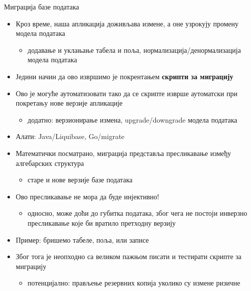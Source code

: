 \documentclass[aspectratio=169]{beamer}
\begin{document}
    \begin{frame}[allowframebreaks]{Миграција базе података}
        \begin{itemize}
            \item Кроз време, наша апликација доживљава измене, а оне узрокују промену модела података
            \begin{itemize}
                \item додавање и уклањање табела и поља, нормализација/денормализација модела података
            \end{itemize}
            \item Једини начин да ово извршимо је покрентањем \textbf{скрипти за миграцију}
            \item Ово је могуће аутоматизовати тако да се скрипте изврше аутоматски при покретању нове верзије апликације
            \begin{itemize}
                \item додатно: верзионирање измена, upgrade/downgrade модела података
            \end{itemize}
            \item Алати: Java/Liquibase, Go/migrate
        \end{itemize}
        
        \framebreak
        
        \begin{itemize}
            \item Математички посматрано, миграција представља пресликавање између алгебарских структура
            \begin{itemize}
                \item старе и нове верзије базе података
            \end{itemize}
            \item Ово пресликавање не мора да буде инјективно!
            \begin{itemize}
                \item односно, може доћи до губитка података, због чега не постоји инверзно пресликавање које би вратило претходну верзију
            \end{itemize}
            \item Пример: бришемо табеле, поља, или записе
            \item Због тога је неопходно са великом пажњом писати и тестирати скрипте за миграцију
            \begin{itemize}
                \item потенцијално: прављење резервних копија уколико су измене ризичне
            \end{itemize}
        \end{itemize}
        

\end{frame}
\end{document}
